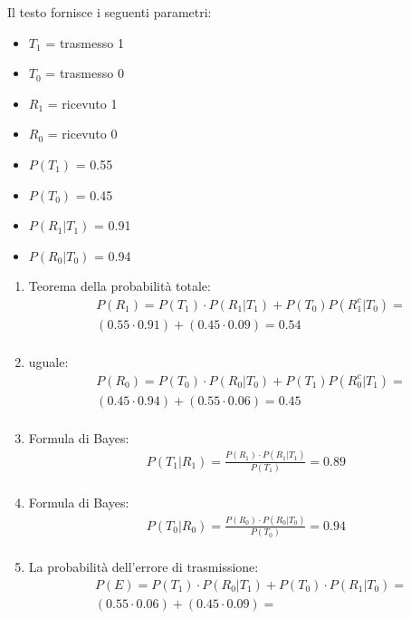 \documentclass[12pt]{article}
\begin{document}
Il testo fornisce i seguenti parametri:
\begin{itemize}
    \item \(T_1\) = trasmesso 1
    \item \(T_0\) = trasmesso 0
    \item \(R_1\) = ricevuto 1
    \item \(R_0\) = ricevuto 0
    \item \(P(T_1)\) = 0.55
    \item \(P(T_0)\) = 0.45
    \item \(P(R_1|T_1)\) = 0.91
    \item \(P(R_0|T_0)\) = 0.94
\end{itemize}
\begin{enumerate}
    \item Teorema della probabilità totale:
    \begin{align*}
        &P(R_1) = P(T_1)\cdot P(R_1|T_1)+P(T_0)P(R_1^c|T_0) = \\
        &(0.55 \cdot 0.91) + (0.45 \cdot 0.09) = 0.54 \\
    \end{align*}
    \item uguale:
    \begin{align*}
        &P(R_0) = P(T_0)\cdot P(R_0|T_0)+P(T_1)P(R_0^c|T_1) = \\
        &(0.45 \cdot 0.94) + (0.55 \cdot 0.06) = 0.45 \\
    \end{align*}
    \item Formula di Bayes:
    \begin{align*}
        P(T_1|R_1) = \frac{P(R_1) \cdot P(R_1|T_1)}{P(T_1)} = 0.89 \\
    \end{align*}
    \item Formula di Bayes:
    \begin{align*}
        P(T_0|R_0) = \frac{P(R_0) \cdot P(R_0|T_0)}{P(T_0)} = 0.94 \\
    \end{align*}
    \item La probabilità dell'errore di trasmissione:
    \begin{align*}
        &P(E) = P(T_1)\cdot P(R_0|T_1)+P(T_0)\cdot P(R_1|T_0) = \\
        &(0.55 \cdot 0.06) + (0.45 \cdot 0.09) = 
    \end{align*}
\end{enumerate}
\end{document}

